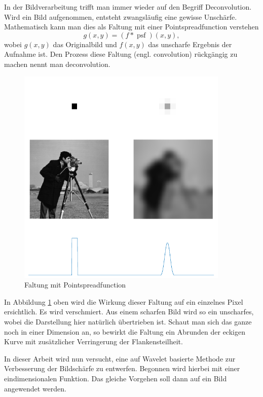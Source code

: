In der Bildverarbeitung trifft man immer wieder auf den Begriff Deconvolution.
Wird ein Bild aufgenommen, entsteht zwangsläufig eine gewisse Unschärfe.
Mathematisch kann man dies als Faltung mit einer Pointspreadfunction verstehen
$$g(x,y) = (f*\operatorname{psf})(x,y),$$
wobei $g(x,y)$ das Originalbild und $f(x,y)$ das unscharfe Ergebnis der Aufnahme ist.
Den Prozess diese Faltung (engl. convolution) rückgängig zu machen nennt man deconvolution.
\begin{figure}[h]
\centering
\includegraphics[width=0.9\textwidth]{./papers/deconvolve/pictures/psf.pdf}
\caption{Faltung mit Pointspreadfunction\label{deconvolve:pic}}
\end{figure}

In Abbildung \ref{deconvolve:pic} oben wird die Wirkung dieser Faltung auf ein einzelnes Pixel ersichtlich.
Es wird \glqq verschmiert\grqq{}.
Aus einem scharfen Bild wird so ein unscharfes, wobei die Darstellung hier natürlich übertrieben ist.
Schaut man sich das ganze noch in einer Dimension an, so bewirkt die Faltung ein Abrunden der eckigen Kurve mit zusätzlicher Verringerung der Flankensteilheit.

In dieser Arbeit wird nun versucht, eine auf Wavelet basierte Methode zur Verbesserung der Bildschärfe zu entwerfen.
Begonnen wird hierbei mit einer eindimensionalen Funktion.
Das gleiche Vorgehen soll dann auf ein Bild angewendet werden.